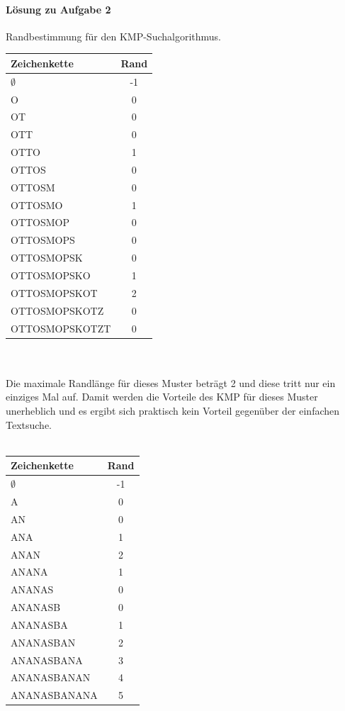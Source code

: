 \documentclass[11pt,a4paper]{scrartcl}
\begin{document}
\paragraph{Lösung zu Aufgabe 2}
\label{a2.2:lsg}
Randbestimmung für den KMP-Suchalgorithmus. \\
\begin{tabular}{|l|c|}
\hline
Zeichenkette & Rand \\
\hline
$\emptyset$ & -1 \\
O & 0 \\
OT & 0 \\
OTT & 0 \\
OTTO & 1 \\
OTTOS & 0 \\
OTTOSM & 0 \\
OTTOSMO & 1 \\
OTTOSMOP & 0 \\
OTTOSMOPS & 0 \\
OTTOSMOPSK & 0 \\
OTTOSMOPSKO & 1 \\
OTTOSMOPSKOT & 2 \\
OTTOSMOPSKOTZ & 0 \\
OTTOSMOPSKOTZT & 0 \\
\hline
\end{tabular} \\\\
Die maximale Randlänge für dieses Muster beträgt 2 und diese tritt nur ein einziges Mal auf. Damit werden die Vorteile des KMP für dieses Muster unerheblich und es ergibt sich praktisch kein Vorteil gegenüber der einfachen Textsuche. \\\\
\begin{tabular}{|l|c|}
\hline
Zeichenkette & Rand \\
\hline
$\emptyset$ & -1 \\
A & 0 \\
AN & 0 \\
ANA & 1 \\
ANAN & 2 \\
ANANA & 1 \\
ANANAS & 0 \\
ANANASB & 0 \\
ANANASBA & 1 \\
ANANASBAN & 2 \\
ANANASBANA & 3 \\
ANANASBANAN & 4 \\
ANANASBANANA & 5 \\
\hline
\end{tabular} \\\\
\end{document}
